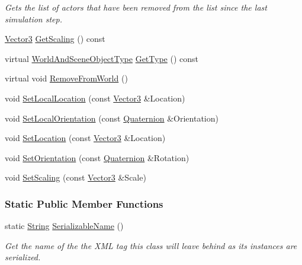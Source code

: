 \begin{DoxyCompactItemize}
\begin{DoxyCompactList}\small\item\em Gets the list of actors that have been removed from the list since the last simulation step. \item\end{DoxyCompactList}\item 
\hyperlink{classMezzanine_1_1Vector3}{Vector3} \hyperlink{classMezzanine_1_1AreaEffect_adc4af3aa8a43d2e08d716990153fb89d}{GetScaling} () const 
\item 
virtual \hyperlink{namespaceMezzanine_ae8cd04f706f4998be62f454b7119c718}{WorldAndSceneObjectType} \hyperlink{classMezzanine_1_1AreaEffect_a2f3df5433f02057d7a9deeb5e6666287}{GetType} () const 
\item 
virtual void \hyperlink{classMezzanine_1_1AreaEffect_aaf2aab50bfb000f3dfec58e97b423a29}{RemoveFromWorld} ()
\item 
void \hyperlink{classMezzanine_1_1AreaEffect_a93056bdf18b07d8067367b368fbf24a1}{SetLocalLocation} (const \hyperlink{classMezzanine_1_1Vector3}{Vector3} \&Location)
\item 
void \hyperlink{classMezzanine_1_1AreaEffect_a59907341f2a0c8814b7962f010cea587}{SetLocalOrientation} (const \hyperlink{classMezzanine_1_1Quaternion}{Quaternion} \&Orientation)
\item 
void \hyperlink{classMezzanine_1_1AreaEffect_a4dd22757bc627242de169e31a1717139}{SetLocation} (const \hyperlink{classMezzanine_1_1Vector3}{Vector3} \&Location)
\item 
void \hyperlink{classMezzanine_1_1AreaEffect_a62bcda0a0c2a95b8f1ccdfe2cd3d1018}{SetOrientation} (const \hyperlink{classMezzanine_1_1Quaternion}{Quaternion} \&Rotation)
\item 
void \hyperlink{classMezzanine_1_1AreaEffect_ae0448d98c3689ae407734bbcd85a08cb}{SetScaling} (const \hyperlink{classMezzanine_1_1Vector3}{Vector3} \&Scale)
\end{DoxyCompactItemize}
\subsubsection*{Static Public Member Functions}
\begin{DoxyCompactItemize}
\item 
static \hyperlink{namespaceMezzanine_acf9fcc130e6ebf08e3d8491aebcf1c86}{String} \hyperlink{classMezzanine_1_1AreaEffect_abfe41a07b8aa9bf9adf1be8b7f621e8a}{SerializableName} ()
\begin{DoxyCompactList}\small\item\em Get the name of the the XML tag this class will leave behind as its instances are serialized. \item\end{DoxyCompactList}\end{DoxyCompactItemize}
